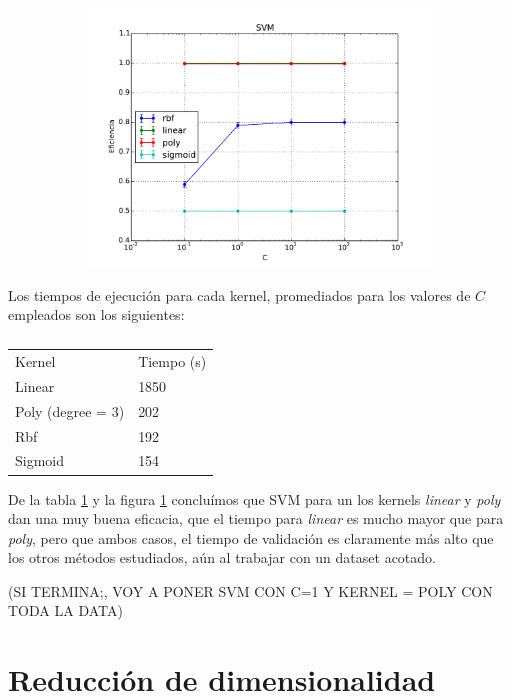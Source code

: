 \documentclass[a4paper,10pt]{article}
\begin{document}
\begin{figure}[H]
  \centering
  \begin{subfigure}[b]{0.4\textwidth}
    \includegraphics[width=\textwidth]{../imagenes/SVM}
     \caption{}
  \end{subfigure}
  \label{fig:svm}
\end{figure}

\par Los tiempos de ejecución para cada kernel, promediados para los valores de $C$ empleados son los siguientes:
\begin{table}[H]
\centering
\caption{}
\label{table:time_svm}
\begin{tabular}{ll}
Kernel & Tiempo (s) \\
Linear & 1850 \\
Poly (degree = 3) & 202 \\
Rbf & 192 \\
Sigmoid & 154 \\
\end{tabular}
\end{table}
De la tabla \ref{table:time_svm} y la figura \ref{fig:svm} concluímos que SVM para un los kernels \emph{linear} y \emph{poly} dan una muy buena eficacia, que el tiempo para \emph{linear} es mucho mayor que para \emph{poly}, pero que ambos casos, el tiempo de validación es claramente más alto que los otros métodos estudiados, aún al trabajar con un dataset acotado.

(SI TERMINA;, VOY A PONER SVM CON C=1 Y KERNEL = POLY CON TODA LA DATA)

\section{Reducci\'on de dimensionalidad}
\end{document}
